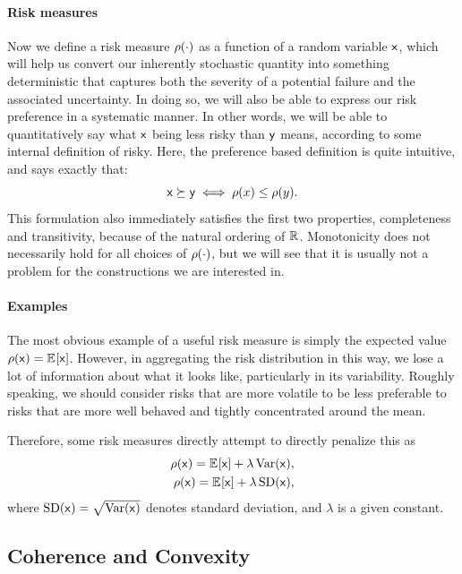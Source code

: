 \paragraph{Risk measures} Now we define a risk measure $\rsd$ as a function of a random variable $\mathsf x$, which will help us convert our inherently stochastic quantity into something deterministic that captures both the severity of a potential failure and the associated uncertainty. In doing so, we will also be able to express our risk preference in a systematic manner. In other words, we will be able to quantitatively say what $\mathsf x$ being less risky than $\mathsf y$ means, according to some internal definition of risky. Here, the preference based definition is quite intuitive, and says exactly that:
\begin{equation}
    \rx \succeq \ry \iff \rs{x} \le \rs{y}.
\end{equation}
This formulation also immediately satisfies the first two properties, completeness and transitivity, because of the natural ordering of $\mathbb R$. Monotonicity does not necessarily hold for all choices of $\rsd$, but we will see that it is usually not a problem for the constructions we are interested in. 

\paragraph{Examples} The most obvious example of a useful risk measure is simply the expected value $\rs{\rx}=\EX{}{\rx}$. However, in aggregating the risk distribution in this way, we lose a lot of information about what it looks like, particularly in its variability. Roughly speaking, we should consider risks that are more volatile to be less preferable to risks that are more well behaved and tightly concentrated around the mean. 
\begin{example}
    Therefore, some risk measures directly attempt to directly penalize this as
    \begin{align}
        \rs{\rx} = \EX{}{\rx} + \lambda\Var\pars*{\rx},\\
        \rs{\rx} = \EX{}{\rx} + \lambda\SD\pars*{\rx},
    \end{align}
    where $\SD\pars*{\rx}=\sqrt{\Var\pars*{\rx}}$ denotes standard deviation, and $\lambda$ is a given constant.
\end{example}

\subsection{Coherence and Convexity}

